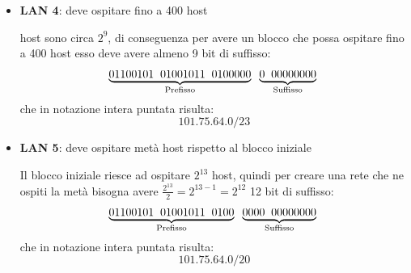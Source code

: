 \documentclass[a4paper]{article}
\begin{document}
\begin{itemize}
  \item \textbf{LAN 4}: deve ospitare fino a 400 host

    \vspace{1em}
     host sono circa \( 2^{9} \), di conseguenza per avere un blocco che possa
    ospitare fino a 400 host esso deve avere almeno 9 bit di suffisso:
    \[
      \underbrace{01100101 \;\; 01001011 \;\; 0100000}_{\text{Prefisso}}
      \;\; \underbrace{0 \;\; 00000000}_{\text{Suffisso}}\\
    \] 
    che in notazione intera puntata risulta:
    \[
      101.75.64.0/23
    \] 

  \item \textbf{LAN 5}: deve ospitare metà host rispetto al blocco iniziale

    \vspace{1em}
    \noindent
    Il blocco iniziale riesce ad ospitare \( 2^{13} \) host, quindi per creare una rete
    che ne ospiti la metà bisogna avere \( \frac{2^{13}}{2} = 2^{13-1} = 2^{12} \) 12
    bit di suffisso:
    \[
      \underbrace{01100101 \;\; 01001011 \;\; 0100}_{\text{Prefisso}}
      \;\; \underbrace{0000 \;\; 00000000}_{\text{Suffisso}}\\
    \] 
    che in notazione intera puntata risulta:
    \[
      101.75.64.0/20
    \] 
\end{itemize}
\end{document}
